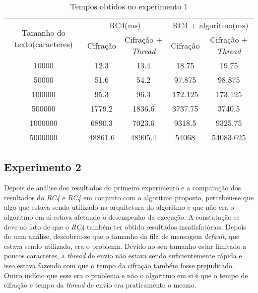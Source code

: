 \begin{table}[h]
\centering
\begin{tabular}{ c c c c c }
\toprule
\multirow{2}{3cm}{Tamanho do texto(caracteres)} & \multicolumn{2}{c}{RC4(ms)}     & \multicolumn{2}{c}{RC4 + algoritmo(ms)} \\ 
                                     & Cifração & Cifração + \textit{Thread} & Cifração     & Cifração + \textit{Thread}     \\ \hline
10000                                & 12.3     & 13.4              & 18.75        & 19.75                 \\ \hline
50000                                & 51.6     & 54.2              & 97.875       & 98.875                \\ \hline
100000                               & 95.3     & 96.3              & 172.125      & 173.125               \\ \hline
500000                               & 1779.2   & 1836.6            & 3737.75      & 3740.5                \\ \hline
1000000                              & 6890.3   & 7023.6            & 9318.5       & 9325.75               \\ \hline
5000000                              & 48861.6  & 48905.4           & 54068        & 54083.625             \\ \hline
\end{tabular}
\caption{Tempos obtidos no experimento 1}
\label{results-experiment-1}
\end{table}

\subsection{Experimento 2}

Depois de análise dos resultados do primeiro experimento e a comparação dos resultados do \textit{RC4} e \textit{RC4} em conjunto com o algoritmo proposto, percebeu-se que algo que estava sendo utilizado na arquitetura do algoritmo e que não era o algoritmo em si estava afetando o desempenho da execução. A constatação se deve ao fato de que o \textit{RC4} também ter obtido resultados insatisfatórios. Depois de uma análise, descobriu-se que o tamanho da fila de mensagem \textit{default}, que estava sendo utilizado, era o problema. Devido ao seu tamanho estar limitado a poucos caracteres, a \textit{thread} de envio não estava sendo suficientemente rápida  e isso estava fazendo com que o tempo da cifração também fosse prejudicado. Outro indício que esse era o problema e não o algoritmo em si é que o tempo de cifração e tempo da \textit{thread} de envio era praticamente o mesmo. 

